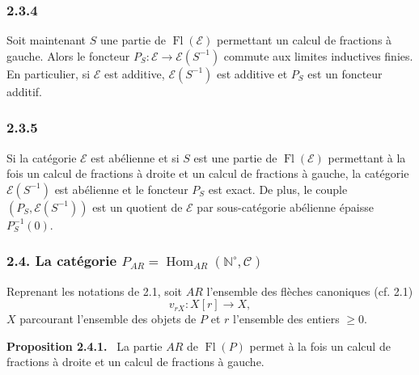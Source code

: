 \documentclass[11pt]{article}
\providecommand{\NN}{\mathbb{N}}
\newenvironment{statement}[1]{\par\medskip\noindent\textbf{#1.}\ }{\par\medskip}
\DeclareMathOperator{\Hom}{Hom}
\providecommand{\Hom}{\operatorname{Hom}}
\providecommand{\Fl}{\operatorname{Fl}}
\providecommand{\NN}{\mathbb N}
\providecommand{\cC}{\mathcal C}
\providecommand{\cE}{\mathcal E}
\providecommand{\cC}{\mathcal C}
\begin{document}
\subsubsection*{2.3.4}
Soit maintenant $S$ une partie de $\Fl(\cE)$ permettant un calcul de fractions à gauche. Alors le foncteur $P_S:\cE\to\cE(S^{-1})$ commute aux limites inductives finies. En particulier, si $\cE$ est additive, $\cE(S^{-1})$ est additive et $P_S$ est un foncteur additif.

\subsubsection*{2.3.5}
Si la catégorie $\cE$ est abélienne et si $S$ est une partie de $\Fl(\cE)$ permettant à la fois un calcul de fractions à droite et un calcul de fractions à gauche, la catégorie $\cE(S^{-1})$ est abélienne et le foncteur $P_S$ est exact. De plus, le couple $(P_S,\cE(S^{-1}))$ est un quotient de $\cE$ par sous-catégorie abélienne épaisse $P_S^{-1}(0)$.

\subsubsection*{2.4. La catégorie $P_{AR}=\Hom_{AR}(\NN^\circ,\cC)$}
Reprenant les notations de 2.1, soit $AR$ l'ensemble des flèches canoniques (cf. 2.1)
\[
v_{rX}:X[r]\longrightarrow X,
\]
$X$ parcourant l'ensemble des objets de $P$ et $r$ l'ensemble des entiers $\ge0$.

\begin{statement}{Proposition 2.4.1}
La partie $AR$ de $\Fl(P)$ permet à la fois un calcul de fractions à droite et un calcul de fractions à gauche.
\end{statement}
\end{document}
